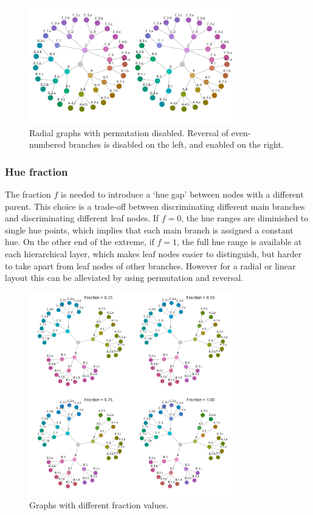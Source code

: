 \documentclass[journal]{vgtc}                %
\begin{document}
\begin{figure}[tb]

  \centering
  \includegraphics[width=3.5in]{HCPgraph2.pdf}
  \caption{Radial graphs with permutation disabled. Reversal of even-numbered branches is disabled on the left, and enabled on the right.}\label{fig:graph_noperm}

\end{figure}


\subsubsection{Hue fraction}\label{secf}

The fraction $f$ is needed to introduce a `hue gap' between nodes with a different parent. This choice is a trade-off between discriminating different main branches and discriminating different leaf nodes. If $f=0$, the hue ranges are diminished to single hue points, which implies that each main branch is assigned a constant hue. On the other end of the extreme, if $f=1$, the full hue range is available at each hierarchical layer, which makes leaf nodes easier to distinguish, but harder to take apart from leaf nodes of other branches. However for a radial or linear layout this can be alleviated by using permutation and reversal.

\begin{figure}[tb]
  \centering
  \includegraphics[width=3.5in]{Graph_hue.pdf}
  \caption{Graphs with different fraction values.}\label{fig:graphf}
\end{figure}
\end{document}
